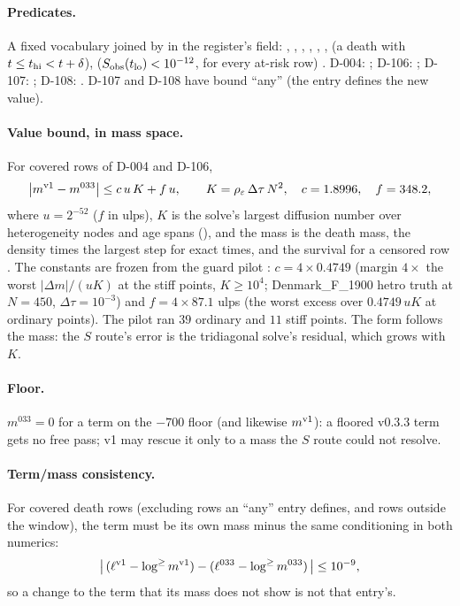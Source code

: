 \paragraph{Predicates.} A fixed vocabulary joined by \code{&} in the register's  field:
, , , , , , 
(a death with $t\le t_{\rm hi}<t+\delta$),  ($S_{\rm obs}(t_{\rm lo})<10^{-12}$, for every at-risk row)
. D-004: ; D-106: ; D-107:
; D-108: . D-107 and D-108 have bound ``any'' (the entry defines the new value).

\paragraph{Value bound, in mass space.} For covered rows of D-004 and D-106,
\begin{equation}
  \big|m^{\rm v1}-m^{033}\big|\le c\,u\,K+f\,u,\qquad K=\rho_\varepsilon\,\Delta\tau\,N^2,\quad c=1.8996,\quad f=348.2,
  \label{eq:fp-guard}
\end{equation}
where $u=2^{-52}$ ($f$ in ulps), $K$ is the solve's largest diffusion number over heterogeneity nodes and age spans
(), and the mass is the death mass, the density times the largest step for exact times, and the
survival for a censored row . The constants are frozen from the guard pilot
: $c=4\times0.4749$ (margin $4\times$ the worst
$|\Delta m|/(uK)$ at the stiff points, $K\ge10^4$; Denmark\_F\_1900 hetro truth at $N=450$, $\Delta\tau=10^{-3}$) and
$f=4\times87.1$ ulps (the worst excess over $0.4749\,uK$ at ordinary points). The pilot ran $39$ ordinary and $11$ stiff
points. The form follows the mass: the $S$ route's error is the tridiagonal solve's residual, which grows with $K$.
\paragraph{Floor.} $m^{033}=0$ for a term on the $-700$ floor (and likewise $m^{\rm v1}$): a floored v0.3.3 term gets no
free pass; v1 may rescue it only to a mass the $S$ route could not resolve.

\paragraph{Term/mass consistency.} For covered death rows (excluding rows an ``any'' entry defines, and rows outside the
window), the term must be its own mass minus the same conditioning in both numerics:
\begin{equation}
  \big|\,(\ell^{\rm v1}-\log^{\ge}m^{\rm v1})-(\ell^{033}-\log^{\ge}m^{033})\,\big|\le10^{-9},
\end{equation}
so a change to the term that its mass does not show is not that entry's.

